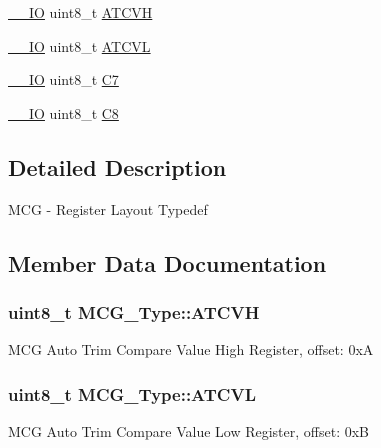 \begin{DoxyCompactItemize}
\item 
\hyperlink{core__sc300_8h_aec43007d9998a0a0e01faede4133d6be}{\+\_\+\+\_\+\+IO} uint8\+\_\+t \hyperlink{structMCG__Type_a57e6ec0cad8ae0e723d21531a184b6e7}{A\+T\+C\+VH}
\item 
\hyperlink{core__sc300_8h_aec43007d9998a0a0e01faede4133d6be}{\+\_\+\+\_\+\+IO} uint8\+\_\+t \hyperlink{structMCG__Type_ae8fea9d52f23143b72c9916e66b252d3}{A\+T\+C\+VL}
\item 
\hyperlink{core__sc300_8h_aec43007d9998a0a0e01faede4133d6be}{\+\_\+\+\_\+\+IO} uint8\+\_\+t \hyperlink{structMCG__Type_a52920de03a5d8c8e4085ebf9f10aa5fd}{C7}
\item 
\hyperlink{core__sc300_8h_aec43007d9998a0a0e01faede4133d6be}{\+\_\+\+\_\+\+IO} uint8\+\_\+t \hyperlink{structMCG__Type_ade4cb987285cb3307821b43d904adcb6}{C8}
\end{DoxyCompactItemize}


\subsection{Detailed Description}
M\+CG -\/ Register Layout Typedef 

\subsection{Member Data Documentation}
\subsubsection[{\texorpdfstring{A\+T\+C\+VH}{ATCVH}}]{ uint8\+\_\+t M\+C\+G\+\_\+\+Type\+::\+A\+T\+C\+VH}\hypertarget{structMCG__Type_a57e6ec0cad8ae0e723d21531a184b6e7}{}\label{structMCG__Type_a57e6ec0cad8ae0e723d21531a184b6e7}
M\+CG Auto Trim Compare Value High Register, offset\+: 0xA 
\subsubsection[{\texorpdfstring{A\+T\+C\+VL}{ATCVL}}]{ uint8\+\_\+t M\+C\+G\+\_\+\+Type\+::\+A\+T\+C\+VL}\hypertarget{structMCG__Type_ae8fea9d52f23143b72c9916e66b252d3}{}\label{structMCG__Type_ae8fea9d52f23143b72c9916e66b252d3}
M\+CG Auto Trim Compare Value Low Register, offset\+: 0xB 
